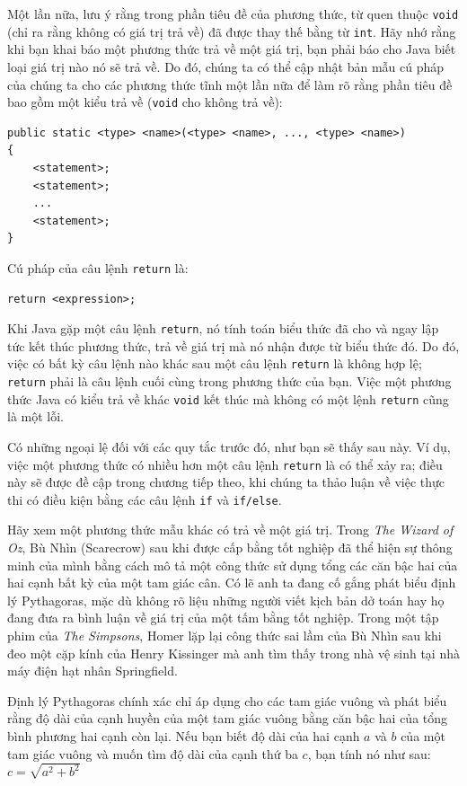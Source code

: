 Một lần nữa, lưu ý rằng trong phần tiêu đề của phương thức, từ quen
thuộc \texttt{void} (chỉ ra rằng không có giá trị trả về) đã được thay
thế bằng từ \texttt{int}. Hãy nhớ rằng khi bạn khai báo một phương thức
trả về một giá trị, bạn phải báo cho Java biết loại giá trị nào nó sẽ
trả về. Do đó, chúng ta có thể cập nhật bản mẫu cú pháp của chúng ta cho
các phương thức tĩnh một lần nữa để làm rõ rằng phần tiêu đề bao gồm một
kiểu trả về (\texttt{void} cho không trả về):

\begin{verbatim}
public static <type> <name>(<type> <name>, ..., <type> <name>) 
{
    <statement>;
    <statement>;
    ...
    <statement>;
}
\end{verbatim}

Cú pháp của câu lệnh \texttt{return} là:

\begin{verbatim}
return <expression>;
\end{verbatim}

Khi Java gặp một câu lệnh \texttt{return}, nó tính toán biểu thức đã cho
và ngay lập tức kết thúc phương thức, trả về giá trị mà nó nhận được từ
biểu thức đó. Do đó, việc có bất kỳ câu lệnh nào khác sau một câu lệnh
\texttt{return} là không hợp lệ; \texttt{return} phải là câu lệnh cuối
cùng trong phương thức của bạn. Việc một phương thức Java có kiểu trả về
khác \texttt{void} kết thúc mà không có một lệnh \texttt{return} cũng là
một lỗi.

Có những ngoại lệ đối với các quy tắc trước đó, như bạn sẽ thấy sau này.
Ví dụ, việc một phương thức có nhiều hơn một câu lệnh \texttt{return} là
có thể xảy ra; điều này sẽ được đề cập trong chương tiếp theo, khi chúng
ta thảo luận về việc thực thi có điều kiện bằng các câu lệnh \texttt{if}
và \texttt{if/else}.

Hãy xem một phương thức mẫu khác có trả về một giá trị. Trong \emph{The
Wizard of Oz}, Bù Nhìn (Scarecrow) sau khi được cấp bằng tốt nghiệp đã
thể hiện sự thông minh của mình bằng cách mô tả một công thức sử dụng
tổng các căn bậc hai của hai cạnh bất kỳ của một tam giác cân. Có lẽ anh
ta đang cố gắng phát biểu định lý Pythagoras, mặc dù không rõ liệu những
người viết kịch bản dở toán hay họ đang đưa ra bình luận về giá trị của
một tấm bằng tốt nghiệp. Trong một tập phim của \emph{The Simpsons},
Homer lặp lại công thức sai lầm của Bù Nhìn sau khi đeo một cặp kính của
Henry Kissinger mà anh tìm thấy trong nhà vệ sinh tại nhà máy điện hạt
nhân Springfield.

Định lý Pythagoras chính xác chỉ áp dụng cho các tam giác vuông và phát
biểu rằng độ dài của cạnh huyền của một tam giác vuông bằng căn bậc hai
của tổng bình phương hai cạnh còn lại. Nếu bạn biết độ dài của hai cạnh
\(a\) và \(b\) của một tam giác vuông và muốn tìm độ dài của cạnh thứ ba
\(c\), bạn tính nó như sau: \(c = \sqrt{a^2 + b^2}\)

